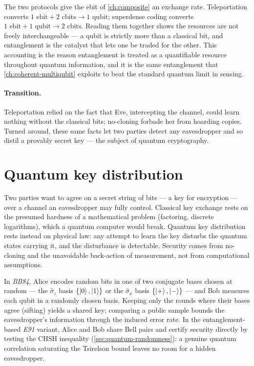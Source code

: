 \begin{application}
\label{app:ebit-currency}
The two protocols give the ebit of \cref{ch:composite} an exchange
rate. Teleportation converts
\(\text{1 ebit}+\text{2 cbits}\to\text{1 qubit}\); superdense coding
converts \(\text{1 ebit}+\text{1 qubit}\to\text{2 cbits}\). Reading them
together shows the resources are not freely interchangeable --- a qubit
is strictly more than a classical bit, and entanglement is the catalyst
that lets one be traded for the other. This accounting is the reason
entanglement is treated as a quantifiable resource throughout quantum
information, and it is the same entanglement that
\cref{ch:coherent-multiqubit} exploits to beat the standard quantum
limit in sensing.
\end{application}

\paragraph{Transition.}
Teleportation relied on the fact that Eve, intercepting the channel,
could learn nothing without the classical bits; no-cloning forbade her
from hoarding copies. Turned around, these same facts let two parties
detect any eavesdropper and so distil a provably secret key --- the
subject of quantum cryptography.

\section{Quantum key distribution}
\label{sec:qkd}

\begin{phenomenon}
Two parties want to agree on a secret string of bits --- a key for
encryption --- over a channel an eavesdropper may fully control.
Classical key exchange rests on the presumed hardness of a mathematical
problem (factoring, discrete logarithms), which a quantum computer would
break. Quantum key distribution rests instead on physical law: any
attempt to learn the key disturbs the quantum states carrying it, and
the disturbance is detectable. Security comes from no-cloning and the
unavoidable back-action of measurement, not from computational
assumptions.
\end{phenomenon}

\begin{statement}
\label{stmt:bb84}
In \emph{BB84}, Alice encodes random bits in one of two conjugate bases
chosen at random --- the $\hat\sigma_z$ basis $\{\ket{0},\ket{1}\}$ or
the $\hat\sigma_x$ basis $\{\ket{+},\ket{-}\}$ --- and Bob measures each
qubit in a randomly chosen basis. Keeping only the rounds where their
bases agree (sifting) yields a shared key; comparing a public sample
bounds the eavesdropper's information through the induced error rate. In
the entanglement-based \emph{E91} variant, Alice and Bob share Bell
pairs and certify security directly by testing the CHSH inequality
(\cref{sec:quantum-randomness}): a genuine quantum correlation
saturating the Tsirelson bound leaves no room for a hidden eavesdropper.
\end{statement}

